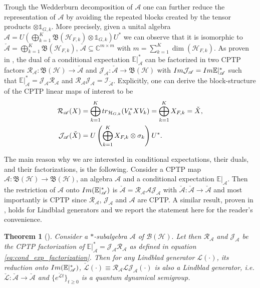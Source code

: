 \documentclass[aihp,12pt]{imsart}
\newcommand{\Ac}{\mathcal{A}}
\newcommand{\Hc}{\mathcal{H}}
\newcommand{\Jc}{\mathcal{J}}
\newcommand{\Rc}{\mathcal{R}}
\newcommand{\Ic}{\mathcal{I}}
\newcommand{\Lc}{\mathcal{L}}
\newcommand{\As}{\mathscr{A}}
\newcommand{\Cb}{\mathbb{C}}
\newcommand{\Bf}{\mathfrak{B}}
\newcommand{\CE}{\mathbb{E}|}
\newcommand{\rs}{\mathcal{R}}
\newcommand{\es}{\mathcal{J}}
\newcommand{\one}{\mathbb{1}}
\newcommand{\tr}{{\rm tr}}
\theoremstyle{theorem}
\newtheorem{theorem}{Theorem}
\theoremstyle{definition}
\theoremstyle{remark}
\begin{document}
Trough the Wedderburn decomposition of $\As$ one can further reduce the representation of $\As$ by avoiding the repeated blocks created by the tensor products $\otimes\one_{G,k}$. More precisely, given a unital algebra $\As= U\left(\bigoplus_{k=1}^K \Bf(\Hc_{F,k}) \otimes \one_{G,k}\right)U^*$ 
we can observe that it is isomorphic to $\check{\As} = \bigoplus_{k=1}^K \Bf(\Hc_{F,k})$, $\check{\As}\subseteq \Cb^{m\times m}$ with $m=\sum_{k=1}^K \dim(\Hc_{F,k})$. 
As proven in \cite[Theorem 1]{tit2023}, the dual of a conditional expectation $\CE_\As^*$ can be factorized in two CPTP factors $\Rc_{\As}:\Bf(\Hc)\to\check{\As}$ and $\Jc_{\As}: \check{\As}\to\Bf(\Hc)$ with ${\rm Im}\Jc_{\As} = {\rm Im}\CE_\As^*$ such that $\CE_\As^* = \Jc_{\As}\Rc_{\As}$ and $\Rc_{\As}\Jc_{\As} = \Ic_{\check{\As}}$.
Explicitly, one can derive the block-structure of the CPTP  linear maps of interest to be 
\begin{equation}
\begin{split}
    \Rc_{\As}(X) &=\bigoplus_{k=1}^K \tr_{\Hc_{G,k}}(V_k^* X V_k)=\bigoplus_{k=1}^K X_{F,k}=\check X,\\
    \Jc_{\As}(\check X)&=U\left(\bigoplus_{k=1}^K X_{F,k} \otimes\sigma_{k}\right)U^*.
\end{split}
    \label{eq:cond_exp_factorization}
\end{equation}

The main reason why we are interested in conditional expectations, their duals, and their factorizations, is the following. Consider a CPTP map $\Ac:\Bf(\Hc)\to\Bf(\Hc)$, an algebra $\As$ and a conditional expectation $\CE_\As$. Then the restriction of $\Ac$ onto ${\rm Im}(\CE_\As^*)$ is $\check{\Ac} = \Rc_{\As}  \Ac  \Jc_{\As}$ with $\check{\Ac}:\check{\As}\to\check{\As}$ and most importantly is CPTP since $\Rc_{\As}$, $\Jc_{\As}$ and $\Ac$ are CPTP. A similar result, proven in \cite{prxq2024}, holds for Lindblad generators and we report the statement here for the reader's convenience.

\begin{theorem}[\cite{prxq2024}]
\label{thm:Lindblad reduction}
 Consider a $*$-subalgebra $\mathscr{A}$ of $\mathcal{B(H)}.$ 
 Let then $\Rc_\As$ and $\Jc_\As$ be the CPTP factorization of $\CE_\mathscr{A}^* = \es_\As\rs_\As$ as defined in equation \eqref{eq:cond_exp_factorization}. 
 Then for any Lindblad generator $\Lc(\cdot)$, its reduction onto ${\rm Im}(\CE_\As^*)$, $\check{\Lc}(\cdot)\equiv\Rc_\As\Lc\Jc_{\As}(\cdot)$ is also a Lindblad generator, i.e. $\check{\Lc}:\check{\As}\to\check{\As}$ and $\{e^{\check{\Lc}t}\}_{t\geq 0}$ is a quantum dynamical semigroup. 
\end{theorem}
\end{document}
